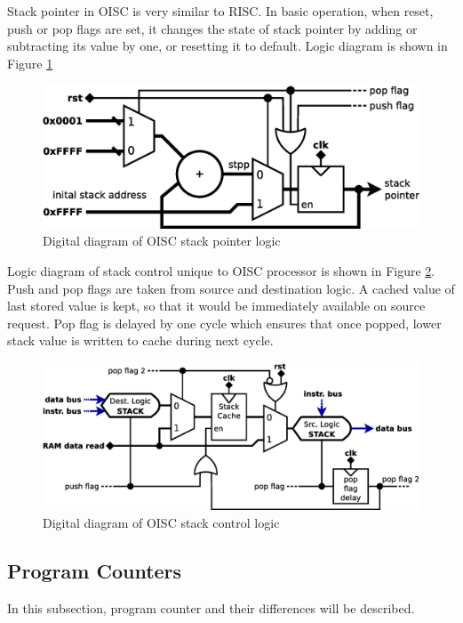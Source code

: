 Stack pointer in OISC is very similar to RISC. In basic operation, when reset, push or pop flags are set, it changes the state of stack pointer by adding or subtracting its value by one, or resetting it to default. Logic diagram is shown in Figure \ref{fig:oisc_stack}
\begin{figure}[b]
	\centering
	\includegraphics[scale=0.4]{../resources/oisc_stack.eps}
	\caption{Digital diagram of OISC stack pointer logic}
	\label{fig:oisc_stack}
\end{figure}

Logic diagram of stack control unique to OISC processor is shown in Figure \ref{fig:oisc_stack_2}. Push and pop flags are taken from source and destination logic. A cached value of last stored value is kept, so that it would be immediately available on source request. Pop flag is delayed by one cycle which ensures that once popped, lower stack value is written to cache during next cycle.
\begin{figure}
	\centering
	\includegraphics[scale=0.4]{../resources/oisc_stack_2.eps}
	\caption{Digital diagram of OISC stack control logic}
	\label{fig:oisc_stack_2}
\end{figure}

\subsection{Program Counters} \label{subsec:pc}
In this subsection, program counter and their differences will be described.

